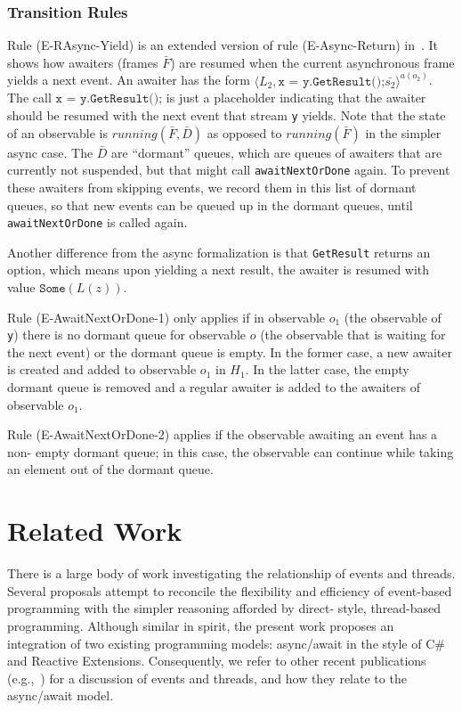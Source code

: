 \documentclass{acm_proc_article-sp}
\newcommand{\aframe}[3]{\langle #1, #2 \rangle ^{#3}}
\begin{document}
\subsubsection{Transition Rules}

Rule (E-RAsync-Yield) is an extended version of rule (E-Async-Return)
in~\cite{FormalizingAsync}. It shows how awaiters (frames $\bar{F}$) are
resumed when the current asynchronous frame yields a next event. An awaiter
has the form $\aframe {L_2} {\texttt{x = y.GetResult();} \bar{s_2}} {a(o_2)}$.
The call $\texttt{x = y.GetResult();}$ is just a placeholder indicating that
the awaiter should be resumed with the next event that stream \verb|y| yields.
Note that the state of an observable is $running(\bar{F}, \bar{D})$ as opposed to
$running(\bar{F})$ in the simpler async case. The $\bar{D}$ are ``dormant''
queues, which are queues of awaiters that are currently not suspended, but
that might call \verb|awaitNextOrDone| again. To prevent these awaiters from
skipping events, we record them in this list of dormant queues, so that new
events can be queued up in the dormant queues, until \verb|awaitNextOrDone| is
called again.

Another difference from the async formalization is that \verb|GetResult|
returns an option, which means upon yielding a next result, the awaiter is
resumed with value $\texttt{Some}(L(z))$.

Rule (E-AwaitNextOrDone-1) only applies if in observable $o_1$ (the observable
of \verb|y|) there is no dormant queue for observable $o$ (the observable that
is waiting for the next event) or the dormant queue is empty. In the former
case, a new awaiter is created and added to observable $o_1$ in $H_1$. In the
latter case, the empty dormant queue is removed and a regular awaiter is added
to the awaiters of observable $o_1$.

Rule (E-AwaitNextOrDone-2) applies if the observable awaiting an event has a non-
empty dormant queue; in this case, the observable can continue while taking an
element out of the dormant queue.

\section{Related Work}

There is a large body of work investigating the relationship of events and
threads. Several proposals attempt to reconcile the flexibility and efficiency
of event-based programming with the simpler reasoning afforded by direct-
style, thread-based programming. Although similar in spirit, the present work
proposes an integration of two existing programming models: async/await in the
style of C\# and Reactive Extensions. Consequently, we refer to other recent
publications (e.g.,~\cite{FormalizingAsync}) for a discussion of events and
threads, and how they relate to the async/await model.
\end{document}
